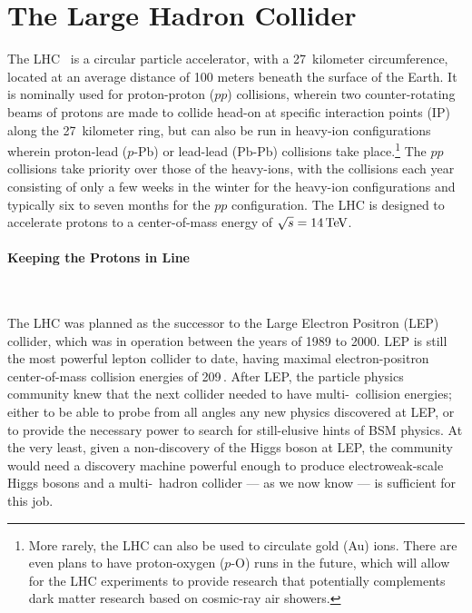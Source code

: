 \section{The Large Hadron Collider}
\label{sec:lhc}

The LHC~\cite{LHCMachine} is a circular particle accelerator, with a 27~kilometer circumference,
located at an average distance of 100 meters beneath the surface of the Earth.
It is nominally used for proton-proton ($pp$) collisions, wherein two counter-rotating
beams of protons are made to collide head-on at specific interaction points (IP) along the 27~kilometer
ring, but can also be run in heavy-ion configurations wherein proton-lead ($p$-Pb) or lead-lead (Pb-Pb)
collisions take place.\footnote{More rarely, the LHC can also be used to circulate gold (Au) ions.
There are even plans to have proton-oxygen ($p$-O) runs in the future, which will allow
for the LHC experiments to provide research that potentially complements dark matter research
based on cosmic-ray air showers.}
{\color{red}{what specific Pb ion?}}
The $pp$ collisions take priority over those of the heavy-ions, with the collisions each year
consisting of only a few weeks in the winter for the heavy-ion configurations and typically
six to seven months for the $pp$ configuration. The LHC is designed to accelerate protons to a
center-of-mass energy of $\sqrt{s} = 14\,\text{Te\kern -0.1em V}$.

\paragraph{Keeping the Protons in Line} \mbox{} \\
\label{sec:dipole}

The LHC was planned as the successor to the Large Electron Positron (LEP) collider, which was in operation
between the years of 1989 to 2000. LEP is still the most powerful lepton collider to date, having maximal electron-positron
center-of-mass collision energies of 209\,\GeV.
After LEP, the particle physics community knew that the next collider needed to have multi-\TeV~collision
energies; either to be able to probe from all angles any new physics discovered at LEP, or
to provide the necessary power to search for still-elusive hints of BSM physics. At the very least,
given a non-discovery of the Higgs boson at LEP, the community would need a discovery machine powerful enough
to produce electroweak-scale Higgs bosons and a multi-\TeV~hadron collider --- as we now know --- is sufficient for this job.


